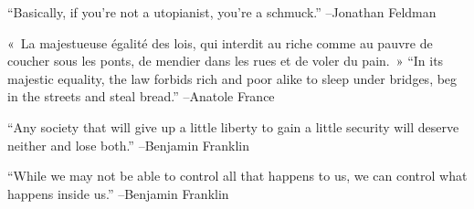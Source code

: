 \documentclass{article}%
\begin{document}
\linebreak%
\vspace{1mm}%
\begin{minipage}{\textwidth}%
\flushleft%
“Basically, if you're not a utopianist, you're a schmuck.”%
\linebreak%
\vspace{1mm}%
–Jonathan Feldman%
\linebreak%
\vspace{1mm}%
\end{minipage}%
\linebreak%
\vspace{1mm}%
\begin{minipage}{\textwidth}%
\flushleft%
«~La majestueuse égalité des lois, qui interdit au riche comme au pauvre de coucher sous les ponts, de mendier dans les rues et de voler du pain.~»%
\linebreak%
\vspace{1mm}%
“In its majestic equality, the law forbids rich and poor alike to sleep under bridges, beg in the streets and steal bread.”%
\linebreak%
–Anatole France%
\linebreak%
\vspace{1mm}%
\end{minipage}%
\linebreak%
\vspace{1mm}%
\begin{minipage}{\textwidth}%
\flushleft%
“Any society that will give up a little liberty to gain a little security will deserve neither and lose both.”%
\linebreak%
\vspace{1mm}%
–Benjamin Franklin%
\linebreak%
\vspace{1mm}%
\end{minipage}%
\linebreak%
\vspace{1mm}%
\begin{minipage}{\textwidth}%
\flushleft%
“While we may not be able to control all that happens to us, we can control what happens inside us.”%
\linebreak%
\vspace{1mm}%
–Benjamin Franklin%
\linebreak%
\vspace{1mm}%
\end{minipage}%
\linebreak%
\vspace{1mm}%
\end{document}
